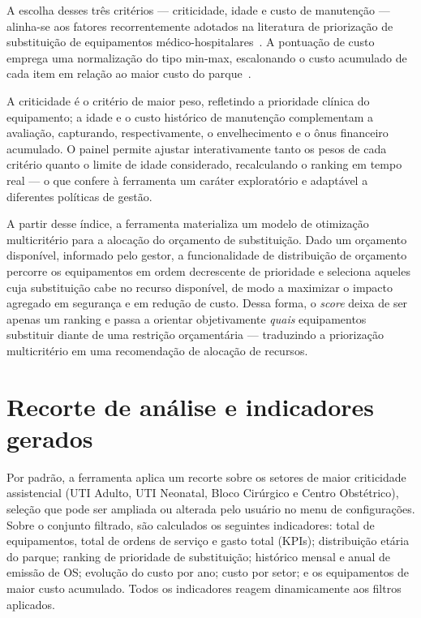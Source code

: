 A escolha desses três critérios --- criticidade, idade e custo de manutenção ---
alinha-se aos fatores recorrentemente adotados na literatura de priorização de
substituição de equipamentos médico-hospitalares~\cite{park2025evaluation,zamzam2021prioritisation}.
A pontuação de custo emprega uma normalização do tipo min-max, escalonando o custo
acumulado de cada item em relação ao maior custo do parque~\cite{sinsomboonthong2022performance}.

A criticidade é o critério de maior peso, refletindo a prioridade clínica do
equipamento; a idade e o custo histórico de manutenção complementam a avaliação,
capturando, respectivamente, o envelhecimento e o ônus financeiro acumulado. O
painel permite ajustar interativamente tanto os pesos de cada critério quanto o
limite de idade considerado, recalculando o ranking em tempo real --- o que
confere à ferramenta um caráter exploratório e adaptável a diferentes políticas
de gestão.

A partir desse índice, a ferramenta materializa um modelo de otimização
multicritério para a alocação do orçamento de substituição. Dado um orçamento
disponível, informado pelo gestor, a funcionalidade de distribuição de orçamento
percorre os equipamentos em ordem decrescente de prioridade e seleciona aqueles
cuja substituição cabe no recurso disponível, de modo a maximizar o impacto
agregado em segurança e em redução de custo. Dessa forma, o \textit{score} deixa
de ser apenas um ranking e passa a orientar objetivamente \textit{quais}
equipamentos substituir diante de uma restrição orçamentária --- traduzindo a
priorização multicritério em uma recomendação de alocação de recursos.

\section{Recorte de análise e indicadores gerados}

Por padrão, a ferramenta aplica um recorte sobre os setores de maior criticidade
assistencial (UTI Adulto, UTI Neonatal, Bloco Cirúrgico e Centro Obstétrico),
seleção que pode ser ampliada ou alterada pelo usuário no menu de configurações.
Sobre o conjunto filtrado, são calculados os seguintes indicadores: total de
equipamentos, total de ordens de serviço e gasto total (KPIs); distribuição
etária do parque; ranking de prioridade de substituição; histórico mensal e anual
de emissão de OS; evolução do custo por ano; custo por setor; e os equipamentos
de maior custo acumulado. Todos os indicadores reagem dinamicamente aos filtros
aplicados.


